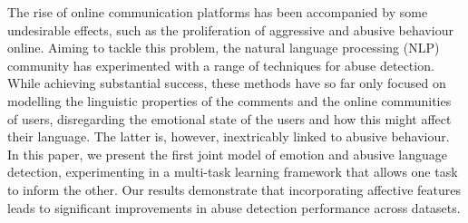 The rise of online communication platforms has been accompanied by some undesirable effects, such as the proliferation of aggressive and abusive behaviour online. Aiming to tackle this problem, the natural language processing (NLP) community has experimented with a range of techniques for abuse detection. While achieving substantial success, these methods have so far only focused on modelling the linguistic properties of the comments and the online communities of users, disregarding the emotional state of the users and how this might affect their language. The latter is, however, inextricably linked to abusive behaviour. In this paper, we present the first joint model of emotion and abusive language detection, experimenting in a multi-task learning framework that allows one task to inform the other. Our results demonstrate that incorporating affective features leads to significant improvements in abuse detection performance across datasets.
